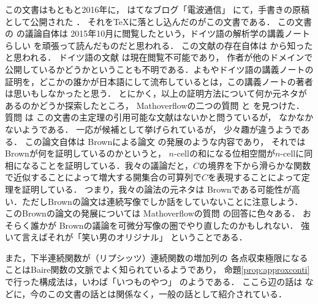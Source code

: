 \documentclass[leqno, a4paper, 12pt, dvipdfmx]{jsarticle}
\begin{document}
この文書はもともと2016年に，
はてなブログ「電波通信」
にて，手書きの原稿として公開された
\cite{Dempa1}．
それを\TeX に落とし込んだのがこの文書である．
この文書の
の議論自体は
2015年10月に閲覧したという，ドイツ語の解析学の講義ノートらしい
\cite{none}
を頑張って読んだものだと思われる．
この文献の存在自体は
\cite{4516}
から知ったと思われる．
ドイツ語の文献
\cite{none}
は現在閲覧不可能であり，
作者が他のドメインで公開しているかどうかということも不明である．よもやドイツ語の講義ノートの証明を，どこかの誰かが日本語にして流布しているとは，この講義ノートの著者は思いもしなかったと思う．
とにかく，以上の証明方法について何か元ネタがあるのかどうか探索したところ，
Mathoverflowの二つの質問
\cite{4468}
と
\cite{198882}
を見つけた．
質問
\cite{198882}
は
この文書の主定理の引用可能な文献はないかと問うているが，
なかなかないようである．
一応\cite{MR0161319}が候補として挙げられているが，
少々趣が違うようである．
この論文自体は
Brownによる論文
\cite{MR0126835}
の発展のような内容であり，
それでは
Brown\cite{MR0126835}が何を証明しているのかというと，
$n$-cellの和になる位相空間が$n$-cellに同相になることを証明している．我々の議論だと，$C$の境界を下から滑らかな関数で近似することによって増大する開集合の可算列で$C$を表現することによって定理を証明している．
つまり，我々の論法の元ネタは
Brown\cite{MR0126835}である可能性が高い．ただしBrownの論文は連続写像でしか話をしていないことに注意しよう．
このBrownの論文の発展については
Mathoverflowの質問
\cite{117475}の回答に色々ある．
おそらく誰かが
Brown\cite{MR0126835}の議論を可微分写像の圏でやり直したのかもしれない．
強いて言えばそれが「笑い男のオリジナル」
ということである．


また，下半連続関数が（リプシッツ）連続関数の増加列の
各点収束極限になることはBaire関数の文脈でよく知られているようであり，
命題\ref{prop:approxconti}
で行った構成法は，いわば「いつものやつ」
のようである．
ここら辺の話は
\cite[Theorem 2.1]{MR4103879}
などに，今のこの文書の話とは関係なく，一般の話として紹介されている．

\nocite{*}


\end{document}
